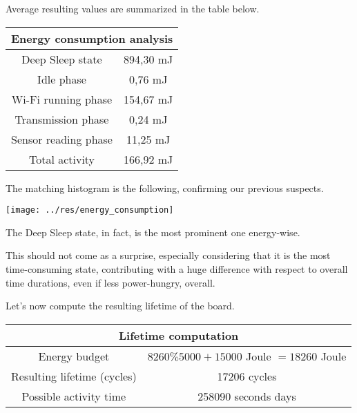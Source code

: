 \documentclass[a4paper,11pt]{article} %
\begin{document}
    Average resulting values are summarized in the table below.

    \smallskip

    \begin{center}
        \begin{tabular}{|c|c|}
            \hline
            \multicolumn{2}{|c|}{Energy consumption analysis} \\
            \hline
            Deep Sleep state     & 894,30 mJ \\
            \hline
            Idle phase           & 0,76 mJ   \\
            \hline
            Wi-Fi running phase  & 154,67 mJ \\
            \hline
            Transmission phase   & 0,24 mJ   \\
            \hline
            Sensor reading phase & 11,25 mJ  \\
            \hline
            Total activity       & 166,92 mJ \\
            \hline
        \end{tabular}
    \end{center}

    \smallskip

    The matching histogram is the following, confirming our previous suspects.

    \medskip

    \begin{center}
        \texttt{[image: ../res/energy\_consumption]}
    \end{center}

    The Deep Sleep state, in fact, is the most prominent one energy-wise.

    This should not come as a surprise, especially considering that it is the most time-consuming state, contributing with a huge difference with respect to overall time durations, even if less power-hungry, overall.

    Let's now compute the resulting lifetime of the board.

    \begin{center}
        \begin{tabular}{|c|c|}
            \hline
            \multicolumn{2}{|c|}{Lifetime computation} \\
            \hline
            Energy budget               & $8260 \% 5000 + 15000$ Joule $= 18260$ Joule \\
            \hline
            Resulting lifetime (cycles) & 17206 cycles                                 \\
            \hline
            Possible activity time      & 258090 seconds \simeq 2 days                 \\
            \hline
        \end{tabular}
    \end{center}
\end{document}
